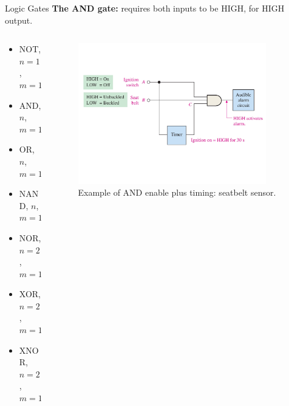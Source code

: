 \documentclass{beamer}
\begin{document}
\begin{frame}{Logic Gates}
\textbf{The AND gate:} requires both inputs to be HIGH, for HIGH output. \\ \vspace{0.5cm}
\begin{columns}[T]
\begin{column}{0.5\textwidth}
\begin{itemize}
\item \alert{NOT, $n=1$, $m=1$}
\item \alert{AND, $n$, $m=1$}
\item OR, $n$, $m=1$
\item NAND, $n$, $m=1$
\item NOR, $n=2$, $m=1$
\item XOR, $n=2$, $m=1$
\item XNOR, $n=2$, $m=1$
\end{itemize}
\end{column}
\begin{column}{0.5\textwidth}
\begin{figure}
\centering
\includegraphics[width=0.9\textwidth,trim=0cm 4cm 0cm 4cm,clip=true]{figures/seat.pdf}
\caption{\label{fig:seat} Example of AND enable plus timing: seatbelt sensor.}
\end{figure}
\end{column}
\end{columns}
\end{frame}
\end{document}

